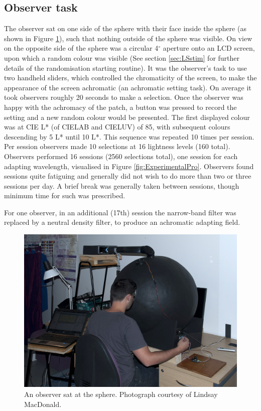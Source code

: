 \subsection{Observer task}

The observer sat on one side of the sphere with their face inside the sphere (as shown in Figure \ref{fig:Alejandro}), such that nothing outside of the sphere was visible. On view on the opposite side of the sphere was a circular 4$^{\circ}$ aperture onto an LCD screen, upon which a random colour was visible (See section \ref{sec:LSstim} for further details of the randomisation starting routine). It was the observer's task to use two handheld sliders, which controlled the chromaticity of the screen, to make the appearance of the screen achromatic (an achromatic setting task). On average it took observers roughly 20 seconds to make a selection. Once the observer was happy with the achromacy of the patch, a button was pressed to record the setting and a new random colour would be presented. The first displayed colour was at \gls{CIE} L* (of CIELAB and CIELUV) of 85, with subsequent colours descending by 5 L* until 10 L*. This sequence was repeated 10 times per session. Per session observers made 10 selections at 16 lightness levels (160 total). Observers performed 16 sessions (2560 selections total), one session for each adapting wavelength, visualised in Figure \ref{fig:ExperimentalPro}. Observers found sessions quite fatiguing and generally did not wish to do more than two or three sessions per day. A brief break was generally taken between sessions, though minimum time for such was prescribed.

For one observer, in an additional (17th) session the narrow-band filter was replaced by a neutral density filter, to produce an achromatic adapting field.

\begin{figure}[htbp]
\includegraphics[max width=\textwidth]{figs/LargeSphere/Alejandro.jpg}
\caption{An observer sat at the sphere. Photograph courtesy of Lindsay MacDonald.}
\label{fig:Alejandro}
\end{figure}

